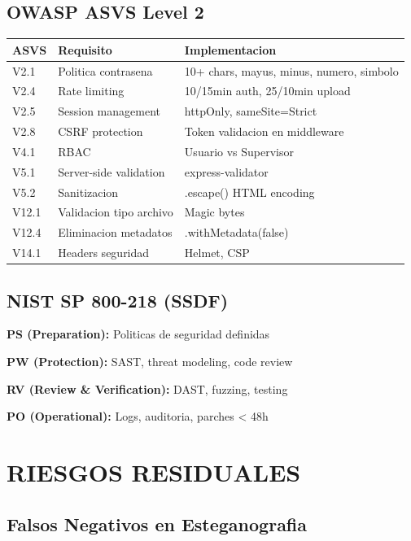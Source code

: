 \documentclass[12pt,a4paper]{article}
\begin{document}
\subsection{OWASP ASVS Level 2}

\begin{tabular}{|l|l|l|}
\hline
\textbf{ASVS} & \textbf{Requisito} & \textbf{Implementacion} \\
\hline
V2.1 & Politica contrasena & 10+ chars, mayus, minus, numero, simbolo \\
\hline
V2.4 & Rate limiting & 10/15min auth, 25/10min upload \\
\hline
V2.5 & Session management & httpOnly, sameSite=Strict \\
\hline
V2.8 & CSRF protection & Token validacion en middleware \\
\hline
V4.1 & RBAC & Usuario vs Supervisor \\
\hline
V5.1 & Server-side validation & express-validator \\
\hline
V5.2 & Sanitizacion & .escape() HTML encoding \\
\hline
V12.1 & Validacion tipo archivo & Magic bytes \\
\hline
V12.4 & Eliminacion metadatos & .withMetadata(false) \\
\hline
V14.1 & Headers seguridad & Helmet, CSP \\
\hline
\end{tabular}

\subsection{NIST SP 800-218 (SSDF)}

\textbf{PS (Preparation):} Politicas de seguridad definidas

\textbf{PW (Protection):} SAST, threat modeling, code review

\textbf{RV (Review \& Verification):} DAST, fuzzing, testing

\textbf{PO (Operational):} Logs, auditoria, parches < 48h

\section{RIESGOS RESIDUALES}

\subsection{Falsos Negativos en Esteganografia}
\end{document}
